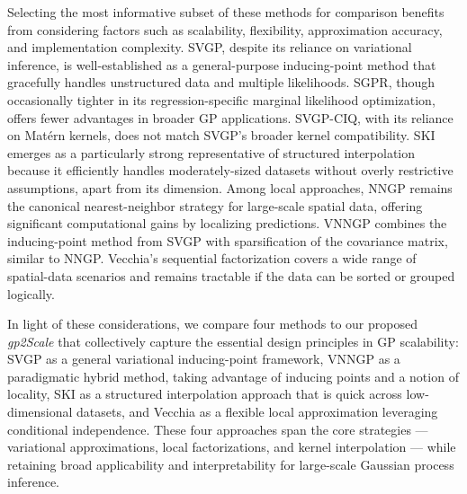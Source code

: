 \documentclass{article}
\begin{document}
Selecting the most informative subset of these methods for comparison benefits from considering factors such as scalability, flexibility, approximation accuracy, and implementation complexity. SVGP, despite its reliance on variational inference, is well-established as a general-purpose inducing-point method that gracefully handles unstructured data and multiple likelihoods. SGPR, though occasionally tighter in its regression-specific marginal likelihood optimization, offers fewer advantages in broader GP applications. SVGP-CIQ, with its reliance on Matérn kernels, does not match SVGP’s broader kernel compatibility. SKI emerges as a particularly strong representative of structured interpolation because it efficiently handles moderately-sized datasets without overly restrictive assumptions, apart from its dimension. Among local approaches, NNGP remains the canonical nearest-neighbor strategy for large-scale spatial data, offering significant computational gains by localizing predictions. VNNGP combines the inducing-point method from SVGP with sparsification of the covariance matrix, similar to NNGP. Vecchia’s sequential factorization covers a wide range of spatial-data scenarios and remains tractable if the data can be sorted or grouped logically.

In light of these considerations, we compare four methods to our proposed \emph{gp2Scale} that collectively capture the essential design principles in GP scalability: SVGP as a general variational inducing-point framework, VNNGP as a paradigmatic hybrid method, taking advantage of inducing points and a notion of locality, SKI as a structured interpolation approach that is quick across low-dimensional datasets, and Vecchia as a flexible local approximation leveraging conditional independence. These four approaches span the core strategies --- variational approximations, local factorizations, and kernel interpolation --- while retaining broad applicability and interpretability for large-scale Gaussian process inference.
\end{document}
